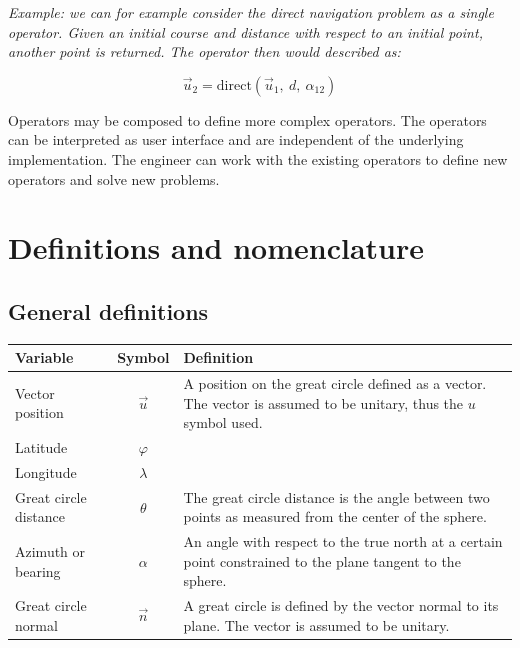 \textit{Example: we can for example consider the direct navigation problem as a single operator. Given an initial course and distance with respect to an initial point, another point is returned. The operator then would described as:}

\begin{equation}
    \vec{u}_2 = \text{direct} (\vec{u}_1, \ d, \ \alpha_{12})
\end{equation}

Operators may be composed to define more complex operators. The operators can be interpreted as user interface and are independent of the underlying implementation. The engineer can work with the existing operators to define new operators and solve new problems.

\section{Definitions and nomenclature}

\subsection{General definitions}
\begin{tabularx}{\linewidth}{|X|c|X|}
    \hline
    Variable  & Symbol & Definition \\
    \hline
    Vector position & $\vec{u}$ & A position on the great circle defined as a vector. The vector is assumed to be unitary, thus the $u$ symbol used. \\
    Latitude & $\varphi$ & \\
    Longitude & $\lambda$ & \\
    Great circle distance & $\theta$ & The great circle distance is  the angle between two points as measured from the center of the sphere. \\
    Azimuth or bearing & $\alpha$ & An angle with respect to the true north at a certain point constrained to the plane tangent to the sphere. \\
    Great circle normal & $\vec{n}$ & A great circle is defined by the vector normal to its plane. The vector is assumed to be unitary. \\
    \hline
\end{tabularx}

